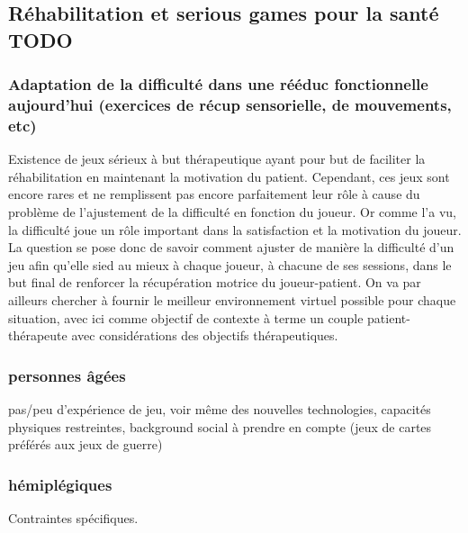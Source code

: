 \subsection{Réhabilitation et serious games pour la santé TODO}

		\subsubsection{Adaptation de la difficulté dans une rééduc fonctionnelle aujourd'hui (exercices de récup sensorielle, de mouvements, etc)}
Existence de jeux sérieux à but thérapeutique ayant pour but de faciliter la réhabilitation en maintenant la motivation du patient. Cependant, ces jeux sont encore rares et ne remplissent pas encore parfaitement leur rôle à cause du problème de l'ajustement de la difficulté en fonction du joueur.
Or comme l'a vu, la difficulté joue un rôle important dans la satisfaction et la motivation du joueur. La question se pose donc de savoir comment ajuster de manière la difficulté d'un jeu afin qu'elle sied au mieux à chaque joueur, à chacune de ses sessions, dans le but final de renforcer la récupération motrice du joueur-patient. On va par ailleurs chercher à fournir le meilleur environnement virtuel possible pour chaque situation, avec ici comme objectif de contexte à terme un couple patient-thérapeute avec considérations des objectifs thérapeutiques. 
		
		\subsubsection{personnes âgées\\}
pas/peu d'expérience de jeu, voir même des nouvelles technologies, capacités physiques restreintes, background social à prendre en compte (jeux de cartes préférés aux jeux de guerre)
		\subsubsection{hémiplégiques\\}		
Contraintes spécifiques.